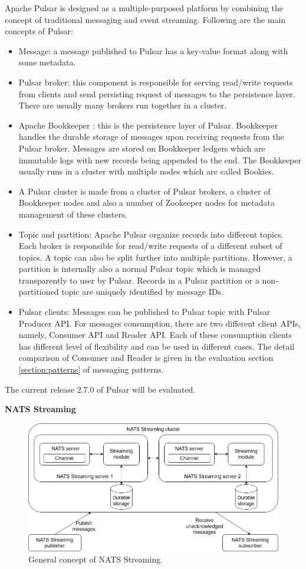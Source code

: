 Apache Pulsar is designed as a multiple-purposed platform by combining the concept of traditional messaging and event streaming. Following are the main concepts of Pulsar:
\begin{itemize}
	\item Message: a message published to Pulsar has a key-value format along with some metadata.
	\item Pulsar broker: this component is responsible for serving read/write requests from clients and send persisting request of messages to the persistence layer. There are usually many brokers run together in a cluster.
	\item Apache Bookkeeper \cite{apachebookkeeper}: this is the persistence layer of Pulsar. Bookkeeper handles the durable storage of messages upon receiving requests from the Pulsar broker. Messages are stored on Bookkeeper ledgers which are immutable logs with new records being appended to the end. The Bookkeeper usually runs in a cluster with multiple nodes which are called Bookies. 
	\item A Pulsar cluster is made from a cluster of Pulsar brokers, a cluster of Bookkeeper nodes and also a number of Zookeeper nodes for metadata management of these clusters.
	\item Topic and partition: Apache Pulsar organize records into different topics. Each broker is responsible for read/write requests of a different subset of topics. A topic can also be split further into multiple partitions. However, a partition is internally also a normal Pulsar topic which is managed transparently to user by Pulsar. Records in a Pulsar partition or a non-partitioned topic are uniquely identified by message IDs.
	\item Pulsar clients: Messages can be published to Pulsar topic with Pulsar Producer API. For messages consumption, there are two different client APIs, namely, Consumer API and Reader API. Each of these consumption clients has different level of flexibility and can be used in different cases. The detail comparison of Consumer and Reader is given in the evaluation section \ref{section:patterns} of messaging patterns.
\end{itemize}

The current release 2.7.0 of Pulsar will be evaluated.

\textbf{NATS Streaming}
\begin{figure}[h]
	\centering
	\includegraphics[width=12cm]{images/general-nats.png}
	\caption{General concept of NATS Streaming.}
	\label{fig:natsgeneral}
\end{figure}


